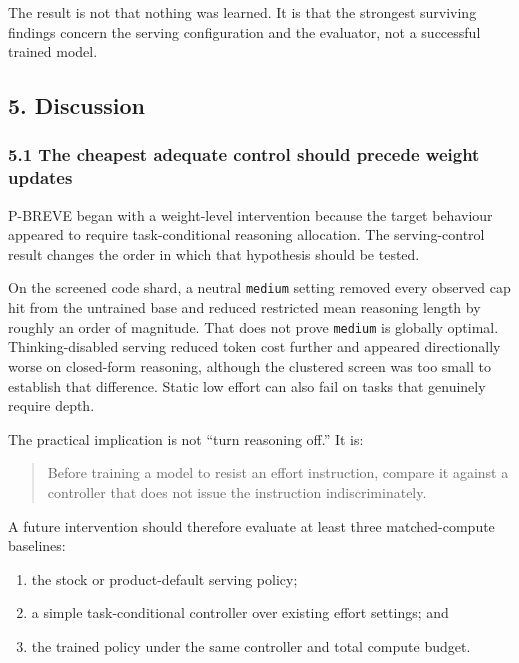 \documentclass[
  9pt,
  letterpaper,
]{article}
\providecommand{\tightlist}{%
  \setlength{\itemsep}{0pt}\setlength{\parskip}{0pt}}
\begin{document}
The result is not that nothing was learned. It is that the strongest
surviving findings concern the serving configuration and the evaluator,
not a successful trained model.

\hypertarget{5-discussion}{%
\subsection{5. Discussion}\label{5-discussion}}

\hypertarget{51-the-cheapest-adequate-control-should-precede-weight-updates}{%
\subsubsection{5.1 The cheapest adequate control should precede weight
updates}\label{51-the-cheapest-adequate-control-should-precede-weight-updates}}

P-BREVE began with a weight-level intervention because the target
behaviour appeared to require task-conditional reasoning allocation. The
serving-control result changes the order in which that hypothesis should
be tested.

On the screened code shard, a neutral \texttt{medium} setting removed
every observed cap hit from the untrained base and reduced restricted
mean reasoning length by roughly an order of magnitude. That does not
prove \texttt{medium} is globally optimal. Thinking-disabled serving
reduced token cost further and appeared directionally worse on
closed-form reasoning, although the clustered screen was too small to
establish that difference. Static low effort can also fail on tasks that
genuinely require depth.

The practical implication is not ``turn reasoning off.'' It is:

\begin{quote}
Before training a model to resist an effort instruction, compare it
against a controller that does not issue the instruction
indiscriminately.
\end{quote}

A future intervention should therefore evaluate at least three
matched-compute baselines:

\begin{enumerate}
\def\labelenumi{\arabic{enumi}.}
\tightlist
\item
  the stock or product-default serving policy;
\item
  a simple task-conditional controller over existing effort settings;
  and
\item
  the trained policy under the same controller and total compute budget.
\end{enumerate}
\end{document}
